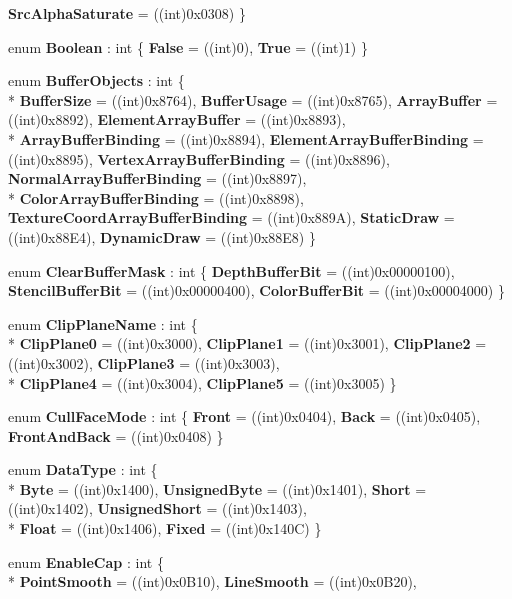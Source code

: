 \begin{DoxyCompactItemize}
{\bfseries Src\-Alpha\-Saturate} = ((int)0x0308)
 \}
\item 
enum {\bfseries Boolean} \-: int \{ {\bfseries False} = ((int)0), 
{\bfseries True} = ((int)1)
 \}
\item 
enum {\bfseries Buffer\-Objects} \-: int \{ \\*
{\bfseries Buffer\-Size} = ((int)0x8764), 
{\bfseries Buffer\-Usage} = ((int)0x8765), 
{\bfseries Array\-Buffer} = ((int)0x8892), 
{\bfseries Element\-Array\-Buffer} = ((int)0x8893), 
\\*
{\bfseries Array\-Buffer\-Binding} = ((int)0x8894), 
{\bfseries Element\-Array\-Buffer\-Binding} = ((int)0x8895), 
{\bfseries Vertex\-Array\-Buffer\-Binding} = ((int)0x8896), 
{\bfseries Normal\-Array\-Buffer\-Binding} = ((int)0x8897), 
\\*
{\bfseries Color\-Array\-Buffer\-Binding} = ((int)0x8898), 
{\bfseries Texture\-Coord\-Array\-Buffer\-Binding} = ((int)0x889\-A), 
{\bfseries Static\-Draw} = ((int)0x88\-E4), 
{\bfseries Dynamic\-Draw} = ((int)0x88\-E8)
 \}
\item 
enum {\bfseries Clear\-Buffer\-Mask} \-: int \{ {\bfseries Depth\-Buffer\-Bit} = ((int)0x00000100), 
{\bfseries Stencil\-Buffer\-Bit} = ((int)0x00000400), 
{\bfseries Color\-Buffer\-Bit} = ((int)0x00004000)
 \}
\item 
enum {\bfseries Clip\-Plane\-Name} \-: int \{ \\*
{\bfseries Clip\-Plane0} = ((int)0x3000), 
{\bfseries Clip\-Plane1} = ((int)0x3001), 
{\bfseries Clip\-Plane2} = ((int)0x3002), 
{\bfseries Clip\-Plane3} = ((int)0x3003), 
\\*
{\bfseries Clip\-Plane4} = ((int)0x3004), 
{\bfseries Clip\-Plane5} = ((int)0x3005)
 \}
\item 
enum {\bfseries Cull\-Face\-Mode} \-: int \{ {\bfseries Front} = ((int)0x0404), 
{\bfseries Back} = ((int)0x0405), 
{\bfseries Front\-And\-Back} = ((int)0x0408)
 \}
\item 
enum {\bfseries Data\-Type} \-: int \{ \\*
{\bfseries Byte} = ((int)0x1400), 
{\bfseries Unsigned\-Byte} = ((int)0x1401), 
{\bfseries Short} = ((int)0x1402), 
{\bfseries Unsigned\-Short} = ((int)0x1403), 
\\*
{\bfseries Float} = ((int)0x1406), 
{\bfseries Fixed} = ((int)0x140\-C)
 \}
\item 
enum {\bfseries Enable\-Cap} \-: int \{ \\*
{\bfseries Point\-Smooth} = ((int)0x0\-B10), 
{\bfseries Line\-Smooth} = ((int)0x0\-B20), 

\end{DoxyCompactItemize}
